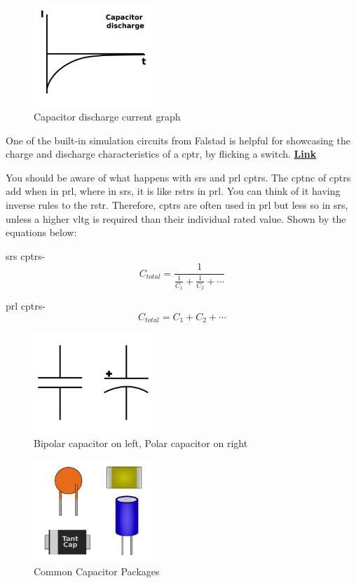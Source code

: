 \documentclass[a4paper,11pt]{report}
\let\oldhref\href %
\renewcommand{\href}[2]{\oldhref{#1}{\bfseries#2}}
\begin{document}
\begin{figure}[H]
\centering
\includegraphics[width=0.4\textwidth]{capacitordischargecurrent}
\caption{Capacitor discharge current graph}
\end{figure}

One of the built-in simulation circuits from Falstad is helpful for showcasing the charge and discharge characteristics of a \gls{cptr}, by flicking a switch. \href{https://tinyurl.com/2erbz4jy}{Link}

You should be aware of what happens with \gls{srs} and \gls{prl} \gls{cptr}s. The \gls{cptnc} of \gls{cptr}s add when in \gls{prl}, where in \gls{srs}, it is like \gls{rstr}s in \gls{prl}. You can think of it having inverse rules to the \gls{rstr}. Therefore, \gls{cptr}s are often used in \gls{prl} but less so in \gls{srs}, unless a higher \gls{vltg} is required than their individual rated value. Shown by the equations below:

\gls{srs} \gls{cptr}s- \[C_{total} = \frac{1}{\frac{1}{C_1}+\frac{1}{C_2}+\cdots}\]

\gls{prl} \gls{cptr}s- \[C_{total} = C_1+C_2+\cdots\]

\begin{figure}[H]
\centering
\includegraphics[width=0.4\textwidth]{capacitor1}
\caption{Bipolar capacitor on left, Polar capacitor on right}
\end{figure}

\begin{figure}[H]
\centering
\includegraphics[width=0.4\textwidth]{CapacitorPackages}
\caption{Common Capacitor Packages}
\end{figure}
\end{document}
